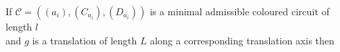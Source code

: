 \documentclass[preview]{standalone}
\begin{document}
\begin{center}
{If $\mathcal{C} = ((a_i), (C_{a_i}), (D_{\overline{a_i}}))$ is a minimal admissible coloured circuit of length $l$  \\ and $g$ is a translation of length $L$ along a corresponding translation axis then}
\end{center}
\end{document}
